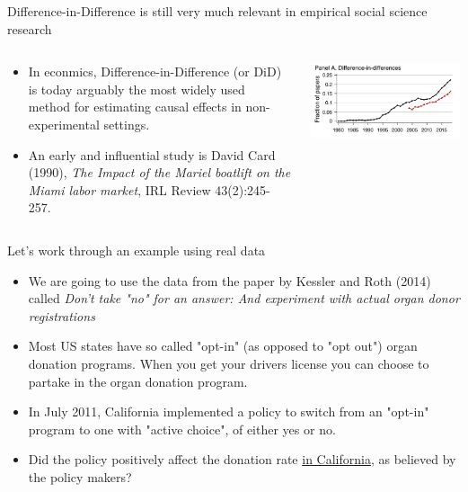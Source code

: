 \documentclass[notes,11pt, aspectratio=169]{beamer}
\begin{document}
\begin{frame}{Difference-in-Difference is still very much relevant in empirical social science research}
\begin{columns}
\begin{column}{0.5\textwidth}
  \begin{itemize}
        \item In econmics, Difference-in-Difference (or DiD) is today arguably the most widely used method for estimating causal effects in non-experimental settings. 
        
        \item An early and influential study is David Card (1990), \emph{The Impact of the Mariel boatlift on the Miami labor market}, IRL Review 43(2):245-257. 
    \end{itemize}
\end{column}

\begin{column}{0.5\textwidth}
 \begin{center}
        \includegraphics[width=1\linewidth]{24_DiDLecture/24_DiDLecture_AEA_DiD.png}
    \end{center}
\end{column}
\end{columns}
\end{frame}


\begin{frame}{Let's work through an example using real data}
\begin{itemize}
    \item We are going to use the data from the paper by Kessler and Roth (2014) called \emph{Don't take "no" for an answer: And experiment with actual organ donor registrations} 
    \item Most US states have so called "opt-in" (as opposed to "opt out") organ donation programs. When you get your drivers license you can choose to partake in the organ donation program.
    \item In July 2011, California implemented a policy to switch from an "opt-in" program to one with "active choice", of either yes or no. 
    \item Did the policy positively affect the donation rate \underline{in California}, as believed by the policy makers? 
\end{itemize}
\end{frame}
\end{document}
